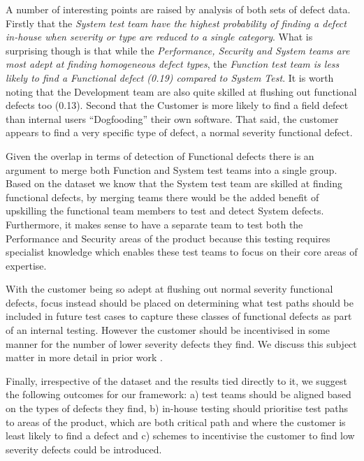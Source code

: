 A number of interesting points are raised by analysis of both sets of defect data. Firstly that the \emph{System test team have the highest probability of finding a defect in-house when severity or type are reduced to a single category}. What is surprising though is that while the \emph{Performance, Security and System teams are most adept at finding homogeneous defect types}, the \emph{Function test team is less likely to find a Functional defect (0.19) compared to System Test}. It is worth noting that the Development team are also quite skilled at flushing out functional defects too (0.13). Second that the Customer is more likely to find a field defect than internal users ``Dogfooding'' their own software. That said, the customer appears to find a very specific type of defect, a normal severity functional defect.  \par 

Given the overlap in terms of detection of Functional defects there is an argument to merge both Function and System test teams into a single group. Based on the dataset we know that the System test team are skilled at finding functional defects, by merging teams there would be the added benefit of upskilling the functional team members to test and detect System defects. Furthermore, it makes sense to have a separate team to test both the Performance and Security areas of the product because this testing requires specialist knowledge which enables these test teams to focus on their core areas of expertise. \par

With the customer being so adept at flushing out normal severity functional defects, focus instead should be placed on determining what test paths should be included in future test cases to capture these classes of functional defects as part of an internal testing. However the customer should be incentivised in some manner for the number of lower severity defects they find. We discuss this subject matter in more detail in prior work \cite{7331827}.

Finally, irrespective of the dataset and the results tied directly to it, we suggest the following outcomes for our framework: a) test teams should be aligned based on the types of defects they find, b) in-house testing should prioritise test paths to areas of the product, which are both critical path and where the customer is least likely to find a defect and c) schemes to incentivise the customer to find low severity defects could be introduced. \par

